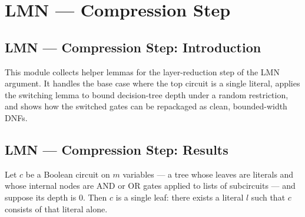 \section{LMN --- Compression Step}
\subsection*{LMN --- Compression Step: Introduction}

This module collects helper lemmas for the layer-reduction step of the LMN argument.
It handles the base case where the top circuit is a single literal, applies the
switching lemma to bound decision-tree depth under a random restriction, and shows how
the switched gates can be repackaged as clean, bounded-width DNFs.

\subsection*{LMN --- Compression Step: Results}

\begin{lemma}
\label{LMN.circuit_depth_zero_is_lit}
\leanok
{}
Let $c$ be a Boolean circuit on $m$ variables — a tree whose leaves are literals and
whose internal nodes are AND or OR gates applied to lists of subcircuits — and suppose
its depth is $0$. Then $c$ is a single leaf: there exists a literal $l$ such that $c$
consists of that literal alone.
\end{lemma}

